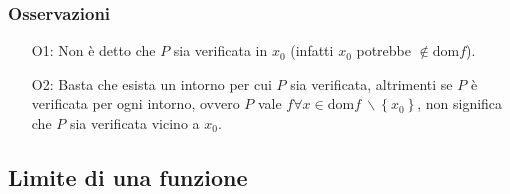 \documentclass[a4paper]{article}
\newcommand\dom{\text{dom}}
\begin{document}
\subsubsection*{Osservazioni}
\begin{itemize}
	\item[O1: ] Non è detto che \(P\) sia verificata in \(x_0\) (infatti \(x_0\) potrebbe \(\notin \dom f\)).
	\item[O2: ] Basta che esista un intorno per cui \(P\) sia verificata, altrimenti se \(P\) è verificata per ogni intorno,
	ovvero \(P\) vale \(f\forall x \in \dom f \  \backslash \left\{ x_0 \right\}\), non significa che \(P\) sia verificata vicino a \(x_0\).
\end{itemize}


\subsection{Limite di una funzione}
\end{document}
